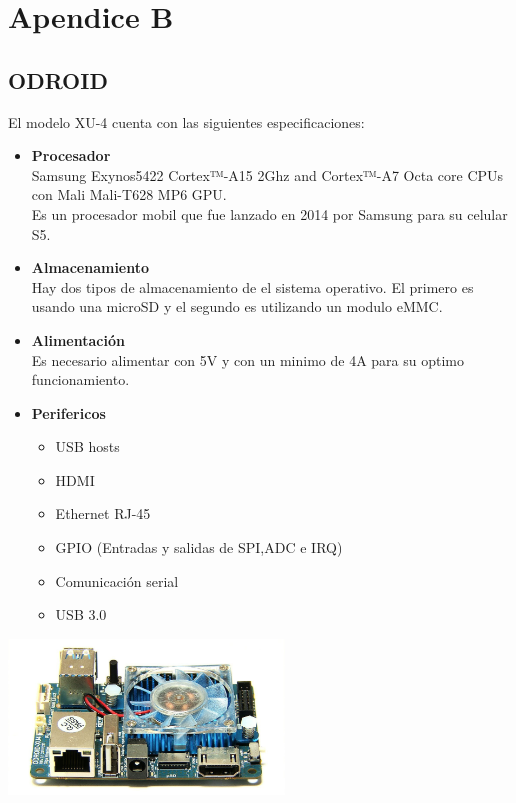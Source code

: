 \chapter{Apendice B}

\section{ODROID}
El modelo XU-4 cuenta con las siguientes especificaciones:~\cite{hardkernel2017}
\begin{itemize}
    \item \textbf{Procesador}\\
    Samsung Exynos5422 Cortex™-A15 2Ghz and Cortex™-A7 Octa
    core CPUs con Mali Mali-T628 MP6 GPU.\\
    Es un procesador mobil que fue lanzado en 2014 por Samsung para su celular S5.
    \item \textbf{Almacenamiento}\\
    Hay dos tipos de almacenamiento de el sistema operativo. El primero es usando
    una microSD y el segundo es utilizando un modulo eMMC.
    \item \textbf{Alimentación}\\
    Es necesario alimentar con 5V y con un minimo de 4A para su optimo funcionamiento.
    \item \textbf{Perifericos}
    \begin{itemize}
        \item USB hosts
        \item HDMI
        \item Ethernet RJ-45
        \item GPIO (Entradas y salidas de SPI,ADC e IRQ)
        \item Comunicación serial
        \item USB 3.0
    \end{itemize}
    
\end{itemize}
\begin{center}
    \includegraphics[width=0.55\textwidth]{Contenido/Back/Apendices/ApendiceB/Fig0.eps}
    \label{Fig5}
\end{center}

